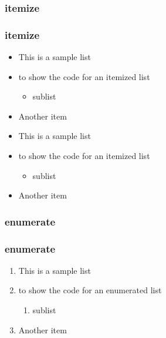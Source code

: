 \subsubsection{itemize}

\begin{frame}[fragile]
\frametitle{itemize}
\begin{teX}
\begin{itemize}
    \item This is a sample list
    \item to show the code for an itemized list
    \begin{itemize}
        \item sublist
    \end{itemize}
    \item Another item
\end{itemize}
\end{teX}
\end{frame}

\begin{frame}
    \begin{itemize}
        \item This is a sample list
        \item to show the code for an itemized list
        \begin{itemize}
            \item sublist
        \end{itemize}
        \item Another item
   \end{itemize}
\end{frame}

\subsubsection{enumerate}

\begin{frame}[fragile]
\frametitle{enumerate}
\begin{teX}
\begin{enumerate}
    \item This is a sample list
    \item to show the code for an enumerated list
    \begin{enumerate}
        \item sublist
    \end{enumerate}
    \item Another item
\end{enumerate}
\end{teX}
\end{frame}

